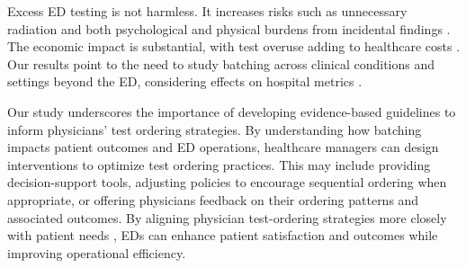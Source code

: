 \documentclass[,,blindrev]{informs}
\begin{document}
Excess ED testing is not harmless. It increases risks such as
unnecessary radiation and both psychological and physical burdens from
incidental findings \citep{Mus2011}. The economic impact is substantial,
with test overuse adding to healthcare costs \citep{Atkinson2023}. Our
results point to the need to study batching across clinical conditions
and settings beyond the ED, considering effects on hospital metrics
\citep[\citet{saghafian2019role}]{Saghafian2019}.

Our study underscores the importance of developing evidence-based
guidelines to inform physicians' test ordering strategies. By
understanding how batching impacts patient outcomes and ED operations,
healthcare managers can design interventions to optimize test ordering
practices. This may include providing decision-support tools, adjusting
policies to encourage sequential ordering when appropriate, or offering
physicians feedback on their ordering patterns and associated outcomes.
By aligning physician test-ordering strategies more closely with patient
needs \citep{Atkinson2023}, EDs can enhance patient satisfaction and
outcomes while improving operational efficiency.

\clearpage

%
%
%


\ACKNOWLEDGMENT{}



\end{document}
